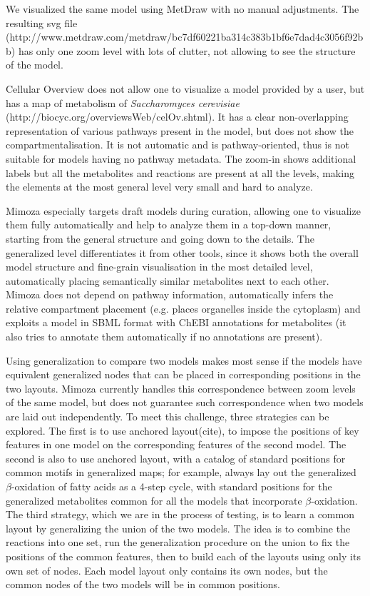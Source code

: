 \documentclass{bmcart}
\begin{document}
We visualized the same model using MetDraw with no manual adjustments. The resulting svg file (http://www.metdraw.com/metdraw/bc7df60221ba314c383b1bf6e7dad4c3056f92bb) has only one zoom level with lots of clutter, not allowing to see the structure of the model.

Cellular Overview does not allow one to visualize a model provided by a user, but has a map of metabolism of \emph{Saccharomyces cerevisiae} (http://biocyc.org/overviewsWeb/celOv.shtml). It has a clear non-overlapping representation of various pathways present in the model, but does not show the compartmentalisation. It is not automatic and is pathway-oriented, thus is not suitable for models having no pathway metadata. The zoom-in shows additional labels but all the metabolites and reactions are present at all the levels, making the elements at the most general level very small and hard to analyze.

Mimoza especially targets draft models during curation, allowing one to visualize them fully automatically and help to analyze them in a top-down manner, starting from the general structure and going down to the details. The generalized level differentiates it from other tools, since it shows both the overall model structure and fine-grain visualisation in the most detailed level, automatically placing semantically similar metabolites next to each other. Mimoza does not depend on pathway information, automatically infers the relative compartment placement (e.g. places organelles inside the cytoplasm) and exploits a model in SBML format with ChEBI annotations for metabolites (it also tries to annotate them automatically if no annotations are present).

Using generalization to compare two models makes most sense if the models have equivalent generalized nodes that can be placed in corresponding positions in the two layouts. Mimoza currently handles this correspondence between zoom levels of the same model, but does not guarantee such correspondence when two models are laid out independently.
To meet this challenge, three strategies can be explored.
The first is to use anchored layout(cite), to impose the positions of key features in one model on the corresponding features of the second model.
The second is also to use anchored layout, with a catalog of standard positions for common motifs in generalized maps; for example, always lay out the generalized $\beta$-oxidation of fatty acids as a 4-step cycle, with standard positions for the generalized metabolites common for all the models that incorporate $\beta$-oxidation.
The third strategy, which we are in the process of testing, is to learn a common layout by generalizing the union of the two models. The idea is to combine the reactions into one set, run the generalization procedure on the union to fix the positions of the common features, then to build each of the layouts using only its own set of nodes. Each model layout only contains its own nodes, but the common nodes of the two models will be in common positions.
\end{document}
